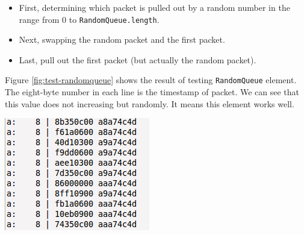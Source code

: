 \documentclass[a4paper]{article}
\begin{document}
  \begin{itemize}
  	\item First, determining which packet is pulled out by a random number in the range from $0$ to \texttt{RandomQueue.length}.
  	\item Next, swapping the random packet and the first packet.
  	\item Last, pull out the first packet (but actually the random packet).
  \end{itemize}
  Figure \ref{fig:test-randomqueue} shows the result of testing \texttt{RandomQueue} element. The eight-byte number in each line is the timestamp of packet. We can see that this value does not increasing but randomly. It means this element works well.
  \begin{center}
	\includegraphics[scale=0.70]{test-randomqueue.png}
	\label{fig:test-randomqueue}
  \end{center}
\end{document}
